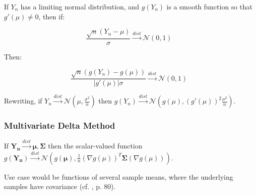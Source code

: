 If $Y_n$ has a limiting normal distribution, and $g(Y_n )$ is a smooth function so that $g'(\mu) \neq 0$, then if:

\begin{equation}
\frac{\sqrt{n}(Y_n - \mu)}{\sigma} \xrightarrow{dist} \mathscr{N}(0,1)
\end{equation}

Then:

\begin{equation}
\frac{\sqrt{n}(g(Y_n)-g(\mu))}{|g'(\mu)|\sigma}\xrightarrow{dist}\mathscr{N}(0,1)
\end{equation}

Rewriting, if $Y_n \xrightarrow{dist}\mathscr{N}(\mu,\frac{\sigma^2}{n})$ then $g(Y_n)\xrightarrow{dist}\mathscr{N}(g(\mu),(g'(\mu))^2\frac{\sigma^2}{n})$.

\subsubsection{Multivariate Delta Method}

If $\mathbf{Y_n} \xrightarrow{dist}\mathscr{\mathbf{\mu},\mathbf{\Sigma}}$ then the scalar-valued function $g(\mathbf{Y_n}) \xrightarrow{dist}\mathscr{N}(g(\mathbf{\mu}),\frac{1}{n} (\nabla g(\mu))^T \mathbf{\Sigma} (\nabla g(\mu)) )$.

Use case would be functions of several sample means, where the underlying samples have covariance (cf. \cite{wasserman2013all}, p. 80).